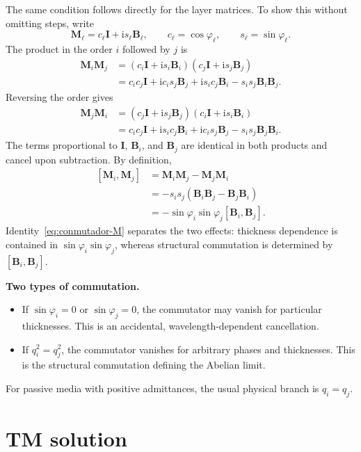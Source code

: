 \documentclass[10pt,a4paper]{article}
\newcommand{\ii}{\mathrm{i}}
\newcommand{\M}{\mathbf{M}}
\newcommand{\B}{\mathbf{B}}
\newcommand{\I}{\mathbf{I}}
\newcommand{\comm}[2]{\left[#1,#2\right]}
\begin{document}
The same condition follows directly for the layer matrices. To show this without omitting steps, write
\begin{equation*}
\M_\ell=c_\ell\I+\ii s_\ell\B_\ell,
\qquad
c_\ell=\cos\varphi_\ell,
\qquad
s_\ell=\sin\varphi_\ell.
\end{equation*}
The product in the order $i$ followed by $j$ is
\begin{align*}
\M_i\M_j
&=(c_i\I+\ii s_i\B_i)(c_j\I+\ii s_j\B_j)
\\
&=c_ic_j\I+\ii c_is_j\B_j+\ii s_ic_j\B_i-s_is_j\B_i\B_j.
\end{align*}
Reversing the order gives
\begin{align*}
\M_j\M_i
&=(c_j\I+\ii s_j\B_j)(c_i\I+\ii s_i\B_i)
\\
&=c_ic_j\I+\ii s_ic_j\B_i+\ii c_is_j\B_j-s_is_j\B_j\B_i.
\end{align*}
The terms proportional to $\I$, $\B_i$, and $\B_j$ are identical in both products and cancel upon subtraction. By definition,
\begin{align}
\comm{\M_i}{\M_j}
&=\M_i\M_j-\M_j\M_i
\nonumber\\
&=-s_is_j\left(\B_i\B_j-\B_j\B_i\right)
\nonumber\\
&=-\sin\varphi_i\sin\varphi_j\comm{\B_i}{\B_j}.
\label{eq:conmutador-M}
\end{align}
Identity~\eqref{eq:conmutador-M} separates the two effects: thickness dependence is contained in $\sin\varphi_i\sin\varphi_j$, whereas structural commutation is determined by $\comm{\B_i}{\B_j}$.

\begin{warningbox}
\textbf{Two types of commutation.}
\begin{itemize}
\item If $\sin\varphi_i=0$ or $\sin\varphi_j=0$, the commutator may vanish for particular thicknesses. This is an accidental, wavelength-dependent cancellation.
\item If $q_i^2=q_j^2$, the commutator vanishes for arbitrary phases and thicknesses. This is the structural commutation defining the Abelian limit.
\end{itemize}
\end{warningbox}

For passive media with positive admittances, the usual physical branch is $q_i=q_j$.

\section{TM solution}
\end{document}
